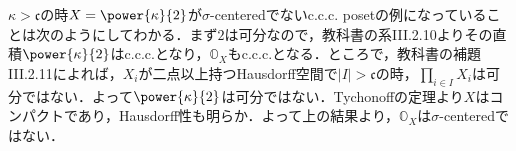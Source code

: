 \documentclass[a4j]{bxjsarticle}
\theoremstyle{definition}
\begin{document}
$\kappa > \mathfrak{c}$の時$X = \power{\kappa}{2}$が$\sigma$-centeredでないc.c.c. posetの例になっていることは次のようにしてわかる．まず$2$は可分なので，教科書の系III.2.10よりその直積$\power{\kappa}{2}$はc.c.c.となり，$\mathbb{O}_{X}$もc.c.c.となる．ところで，教科書の補題III.2.11によれば，$X_i$が二点以上持つHausdorff空間で$|I| > \mathfrak{c}$の時，$\prod_{i \in I} X_i$は可分ではない．よって$\power{\kappa}{2}$は可分ではない．Tychonoffの定理より$X$はコンパクトであり，Hausdorff性も明らか．よって上の結果より，$\mathbb{O}_X$は$\sigma$-centeredではない．

\nocite{Kunen:2011,Matsuzaka:1968,Sakai:2012}
\printbibliography[title=参考文献]
\end{document}
